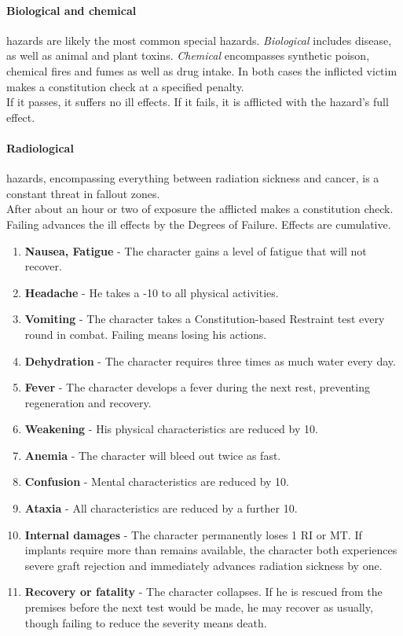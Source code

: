 \documentclass[12pt,a4paper,openany,usenames,dvipsnames]{book}
\begin{document}
	\paragraph{Biological and chemical} hazards are likely the most common special hazards. \emph{Biological} includes disease, as well as animal and plant toxins. \emph{Chemical} encompasses synthetic poison, chemical fires and fumes as well as drug intake. In both cases the inflicted victim makes a constitution check at a specified penalty.\\
	If it passes, it suffers no ill effects. If it fails, it is afflicted with the hazard’s full effect.
	\paragraph{Radiological} hazards, encompassing everything between radiation sickness and cancer, is a constant threat in fallout zones.\\
	After about an hour or two of exposure the afflicted makes a constitution check. Failing advances the ill effects by the Degrees of Failure.
	Effects are cumulative.
	\begin{enumerate}
		\setlength\itemsep{-10mm}
		\item \textbf{Nausea, Fatigue} - The character gains a level of fatigue that will not recover.
		\item \textbf{Headache} - He takes a -10 to all physical activities.
		\item \textbf{Vomiting} - The character takes a Constitution-based Restraint test every round in combat. Failing means losing his actions.
		\item \textbf{Dehydration} - The character requires three times as much water every day.
		\item \textbf{Fever} - The character develops a fever during the next rest, preventing regeneration and recovery.
		\item \textbf{Weakening} - His physical characteristics are reduced by 10.
		\item \textbf{Anemia} - The character will bleed out twice as fast.
		\item \textbf{Confusion} - Mental characteristics are reduced by 10.
		\item \textbf{Ataxia} - All characteristics are reduced by a further 10.
		\item \textbf{Internal damages} - The character permanently loses 1 RI or MT. If implants require more than remains available, the character both experiences severe graft rejection and immediately advances radiation sickness by one.
		\item \textbf{Recovery or fatality} - The character collapses. If he is rescued from the premises before the next test would be made, he may recover as usually, though failing to reduce the severity means death.
	\end{enumerate}
\end{document}
